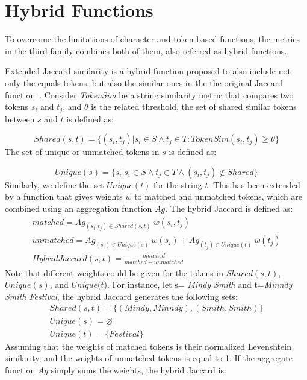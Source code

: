 \section{Hybrid Functions} 
To overcome the limitations of character and token based functions, the metrics in the third family combines both of them, also referred as hybrid functions.

Extended Jaccard similarity is a hybrid function proposed to also include not only the equals tokens, but also the similar ones in the the original Jaccard function~\cite{Weis:SIGMOD05,Ananthakrishna:VLDB02}. Consider \textit{TokenSim} be a string similarity metric that compares two tokens $s_i$ and $t_j$, and $\theta$ is the related threshold, the set of shared similar tokens between $s$ and $t$ is defined as:

\begin{equation*}
	Shared (s,t)=\lbrace (s_i,t_j) | s_i \in S \wedge t_j \in T: TokenSim(s_i,t_j)\geqslant \theta \rbrace
\end{equation*}
The set of unique or unmatched tokens in $s$ is defined as:

\begin{equation*}
	Unique(s)=\lbrace s_i | s_i \in S \wedge t_j \in T \wedge (s_i,t_j) \notin Shared \rbrace
\end{equation*}
Similarly, we define the set $Unique(t)$ for the string $t$. This has been extended by a function that gives weights $w$ to matched and unmatched tokens, which are combined using an aggregation function $Ag$. The hybrid Jaccard is defined as:
\vspace{-2mm}
\begin{gather*}
	matched=Ag_{(s_i,t_j) \in Shared (s,t)} {\ } w(s_i,t_j) \\[1mm]
	unmatched=Ag_{(s_i) \in Unique(s)}  {\ } w(s_i)  + Ag_{(t_j) \in Unique(t)} {\ }  w(t_j)  \\[1mm]
	HybridJaccard(s,t)= \frac{matched}{matched+unmatched}
\end{gather*}
Note that different weights could be given for the tokens in $Shared (s,t)$, $Unique(s)$, and $Unique(t$). For instance, let s= \textit{Mindy Smith} and t=\textit{Minndy Smith Festival}, the hybrid Jaccard generates the following sets: 
\begin{gather*}
Shared(s,t)= \lbrace (Mindy,Minndy),(Smith,Smith) \rbrace \\[1mm]
 Unique(s)= \varnothing  \\[1mm]
 Unique(t)=  \lbrace Festival \rbrace
\end{gather*}
Assuming that the weights of matched tokens is their normalized Levenshtein similarity, and the weights of unmatched tokens is equal to 1. If the aggregate function $Ag$ simply sums the weights, the hybrid Jaccard is:  

